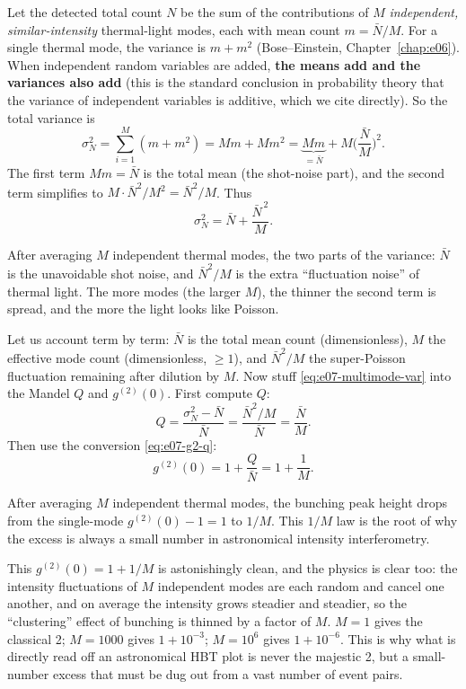Let the detected total count \(N\) be the sum of the contributions of \(M\) \emph{independent, similar-intensity} thermal-light modes, each with mean count \(m=\bar N/M\). For a single thermal mode, the variance is \(m+m^2\) (Bose--Einstein, Chapter~\ref{chap:e06}). When independent random variables are added, \textbf{the means add and the variances also add} (this is the standard conclusion in probability theory that the variance of independent variables is additive, which we cite directly). So the total variance is
\[
  \sigma_N^2=\sum_{i=1}^{M}(m+m^2)=M m+M m^2
  =\underbrace{Mm}_{=\bar N}+M\Big(\frac{\bar N}{M}\Big)^2 .
\]
The first term \(Mm=\bar N\) is the total mean (the shot-noise part), and the second term simplifies to \(M\cdot\bar N^2/M^2=\bar N^2/M\). Thus
\begin{equation}
  \sigma_N^2=\bar N+\frac{\bar N^{\,2}}{M}.
  \label{eq:e07-multimode-var}
\end{equation}
\begin{formulaexplain}
After averaging \(M\) independent thermal modes, the two parts of the variance: \(\bar N\) is the unavoidable shot noise, and \(\bar N^2/M\) is the extra ``fluctuation noise'' of thermal light. The more modes (the larger \(M\)), the thinner the second term is spread, and the more the light looks like Poisson.
\end{formulaexplain}

Let us account term by term: \(\bar N\) is the total mean count (dimensionless), \(M\) the effective mode count (dimensionless, \(\ge1\)), and \(\bar N^2/M\) the super-Poisson fluctuation remaining after dilution by \(M\). Now stuff \eqref{eq:e07-multimode-var} into the Mandel \(Q\) and \(g^{(2)}(0)\). First compute \(Q\):
\[
  Q=\frac{\sigma_N^2-\bar N}{\bar N}
  =\frac{\bar N^2/M}{\bar N}=\frac{\bar N}{M}.
\]
Then use the conversion \eqref{eq:e07-g2-q}:
\begin{equation}
  g^{(2)}(0)=1+\frac{Q}{\bar N}=1+\frac{1}{M}.
  \label{eq:e07-multimode-g2}
\end{equation}
\begin{formulaexplain}
After averaging \(M\) independent thermal modes, the bunching peak height drops from the single-mode \(g^{(2)}(0)-1=1\) to \(1/M\). This \(1/M\) law is the root of why the excess is always a small number in astronomical intensity interferometry.
\end{formulaexplain}

This \(g^{(2)}(0)=1+1/M\) is astonishingly clean, and the physics is clear too: the intensity fluctuations of \(M\) independent modes are each random and cancel one another, and on average the intensity grows steadier and steadier, so the ``clustering'' effect of bunching is thinned by a factor of \(M\). \(M=1\) gives the classical 2; \(M=1000\) gives \(1+10^{-3}\); \(M=10^6\) gives \(1+10^{-6}\). This is why what is directly read off an astronomical HBT plot is never the majestic 2, but a small-number excess that must be dug out from a vast number of event pairs.

